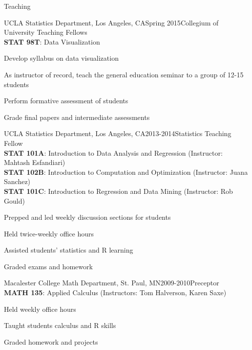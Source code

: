 \documentclass{resume} %
\begin{document}
\clearpage
\begin{rSection}{Teaching}
\begin{rSubsection}{UCLA Statistics Department, }{Los Angeles, CA}{Spring 2015}{Collegium of University Teaching Fellows
\\ \textbf{STAT 98T}: Data Visualization}
\item Develop syllabus on data visualization
\item As instructor of record, teach the general education seminar to a group of 12-15 students
\item Perform formative assessment of students
\item Grade final papers and intermediate assessments
\end{rSubsection}


\begin{rSubsection}{UCLA Statistics Department, }{Los Angeles, CA}{2013-2014}{Statistics Teaching Fellow
\\ \textbf{STAT 101A}: Introduction to Data Analysis and Regression (Instructor: Mahtash Esfandiari)
\\ \textbf{STAT 102B}: Introduction to Computation and Optimization (Instructor: Juana Sanchez)
\\ \textbf{STAT 101C}: Introduction to Regression and Data Mining (Instructor: Rob Gould)}
\item Prepped and led weekly discussion sections for students
\item Held twice-weekly office hours
\item Assisted students' statistics and R learning
\item Graded exams and homework
\end{rSubsection}

\begin{rSubsection}{Macalester College Math Department, }{St. Paul, MN}{2009-2010}{Preceptor
\\ \textbf{MATH 135}: Applied Calculus (Instructors: Tom Halverson, Karen Saxe)}
\item Held weekly office hours
\item Taught students calculus and R skills
\item Graded homework and projects
\end{rSubsection}


\end{rSection}
\end{document}
